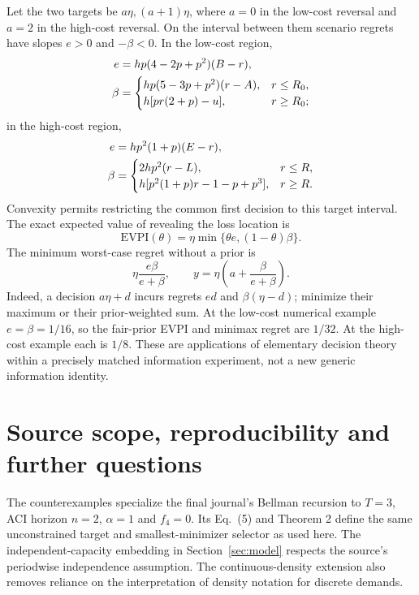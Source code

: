 \documentclass[11pt]{article}
\theoremstyle{remark}\newtheorem{remark}[theorem]{Remark}
\begin{document}
Let the two targets be $a\eta,(a+1)\eta$, where $a=0$ in the low-cost
reversal and $a=2$ in the high-cost reversal. On the interval between
them scenario regrets have slopes $e>0$ and $-\beta<0$. In the low-cost
region,
\begin{align}\label{eq:infolow}
 e&=hp(4-2p+p^2)(B-r),\notag\\
 \beta&=\begin{cases}
 hp(5-3p+p^2)(r-A),&r\le R_0,\\
 h[pr(2+p)-u],&r\ge R_0;
 \end{cases}
\end{align}
in the high-cost region,
\begin{align}\label{eq:infohigh}
 e&=hp^2(1+p)(E-r),\notag\\
 \beta&=\begin{cases}
 2hp^2(r-L),&r\le R,\\
 h[p^2(1+p)r-1-p+p^3],&r\ge R.
 \end{cases}
\end{align}
Convexity permits restricting the common first decision to this target
interval. The exact expected value of revealing the loss location is
\begin{equation}\label{eq:evpi}
 \mathrm{EVPI}(\theta)=\eta\min\{\theta e,(1-\theta)\beta\}.
\end{equation}
The minimum worst-case regret without a prior is
\begin{equation}\label{eq:minimax}
 \eta\frac{e\beta}{e+\beta},\qquad
 y=\eta\left(a+\frac{\beta}{e+\beta}\right).
\end{equation}
Indeed, a decision $a\eta+d$ incurs regrets $ed$ and
$\beta(\eta-d)$; minimize their maximum or their prior-weighted sum.
At the low-cost numerical example $e=\beta=1/16$, so the fair-prior
EVPI and minimax regret are $1/32$. At the high-cost example each is
$1/8$. These are applications of elementary decision theory within a
precisely matched information experiment, not a new generic information
identity.

\section{Source scope, reproducibility and further questions}
The counterexamples specialize the final journal's Bellman recursion
\cite[Eq.~(4), p.~358]{Journal} to $T=3$, ACI horizon $n=2$,
$\alpha=1$ and $f_4=0$. Its Eq.~(5) and Theorem 2 define the same
unconstrained target and smallest-minimizer selector as used here.
The independent-capacity embedding in Section~\ref{sec:model} respects
the source's periodwise independence assumption. The continuous-density
extension also removes reliance on the interpretation of density notation
for discrete demands.
\end{document}
